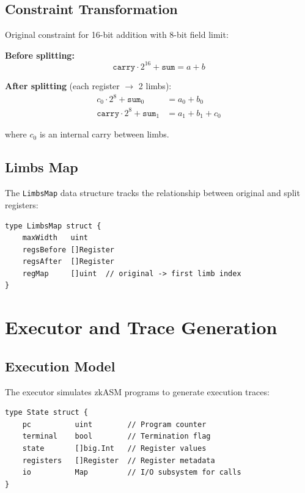 \documentclass[11pt,a4paper]{article}
\begin{document}
\subsection{Constraint Transformation}

Original constraint for 16-bit addition with 8-bit field limit:

\textbf{Before splitting:}
\begin{equation}
\texttt{carry} \cdot 2^{16} + \texttt{sum} = a + b
\end{equation}

\textbf{After splitting} (each register $\to$ 2 limbs):
\begin{align}
c_0 \cdot 2^8 + \texttt{sum}_0 &= a_0 + b_0 \\
\texttt{carry} \cdot 2^8 + \texttt{sum}_1 &= a_1 + b_1 + c_0
\end{align}

where $c_0$ is an internal carry between limbs.

\subsection{Limbs Map}

The \texttt{LimbsMap} data structure tracks the relationship between original and split registers:

\begin{lstlisting}[style=golang,caption={LimbsMap Structure}]
type LimbsMap struct {
    maxWidth   uint
    regsBefore []Register
    regsAfter  []Register
    regMap     []uint  // original -> first limb index
}
\end{lstlisting}

\section{Executor and Trace Generation}

\subsection{Execution Model}

The executor simulates zkASM programs to generate execution traces:

\begin{lstlisting}[style=golang,caption={Executor State}]
type State struct {
    pc          uint        // Program counter
    terminal    bool        // Termination flag
    state       []big.Int   // Register values
    registers   []Register  // Register metadata
    io          Map         // I/O subsystem for calls
}
\end{lstlisting}
\end{document}
